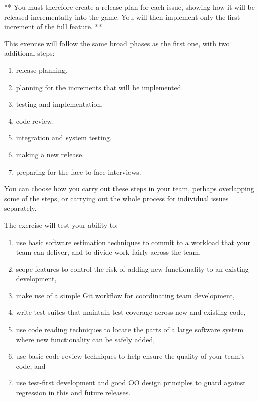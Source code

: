 \documentclass[
]{book}
\providecommand{\tightlist}{%
  \setlength{\itemsep}{0pt}\setlength{\parskip}{0pt}}
\begin{document}
** You must therefore create a release plan for each issue, showing how it will be released incrementally into the game. You will then implement only the first increment of the full feature. **

This exercise will follow the same broad phases as the first one, with two additional steps:

\begin{enumerate}
\def\labelenumi{\arabic{enumi}.}
\tightlist
\item
  release planning.
\item
  planning for the increments that will be implemented.
\item
  testing and implementation.
\item
  code review.
\item
  integration and system testing.
\item
  making a new release.
\item
  preparing for the face-to-face interviews.
\end{enumerate}

You can choose how you carry out these steps in your team, perhaps overlapping some of the steps, or carrying out the whole process for individual issues separately.

The exercise will test your ability to:

\begin{enumerate}
\def\labelenumi{\arabic{enumi}.}
\tightlist
\item
  use basic software estimation techniques to commit to a workload that your team can deliver, and to divide work fairly across the team,
\item
  scope features to control the risk of adding new functionality to an existing development,
\item
  make use of a simple Git workflow for coordinating team development,
\item
  write test suites that maintain test coverage across new and existing code,
\item
  use code reading techniques to locate the parts of a large software system where new functionality can be safely added,
\item
  use basic code review techniques to help ensure the quality of your team's code, and
\item
  use test-first development and good OO design principles to guard against regression in this and future releases.
\end{enumerate}
\end{document}
